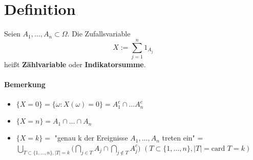 \documentclass[a4paper,11pt,notitlepage]{report}
\begin{document}
\section{Definition}
Seien $A_1, \ldots, A_n \subset \Omega$. Die Zufallsvariable 
$$X := \sum\limits_{j=1}^{n}{1_{A_j}}$$ heißt \textbf{Zählvariable} oder \textbf{Indikatorsumme}.

\paragraph{Bemerkung}
\begin{itemize}
	\item $\{X=0\} = \{\omega \colon X(\omega) = 0 \} = A_{1}^c \cap \ldots A_{n}^c$
	\item $\{X = n \} = A_1 \cap \ldots \cap A_n$
	\item $\{X = k\} = $ "genau k der Ereignisse $A_1, \ldots, A_n$ treten ein" = $\bigcup\limits_{T \subset \{1, \ldots, n\}, |T|=k}{\bigl (\bigcap\limits_{j \in T}{A_j} \cap \bigcap\limits_{j \notin T}{A_{j}^c} \bigr )}$ \newline
$(T \subset \{1, \ldots, n\}, |T| = \text{card } T = k)$
\end{itemize}
\end{document}
